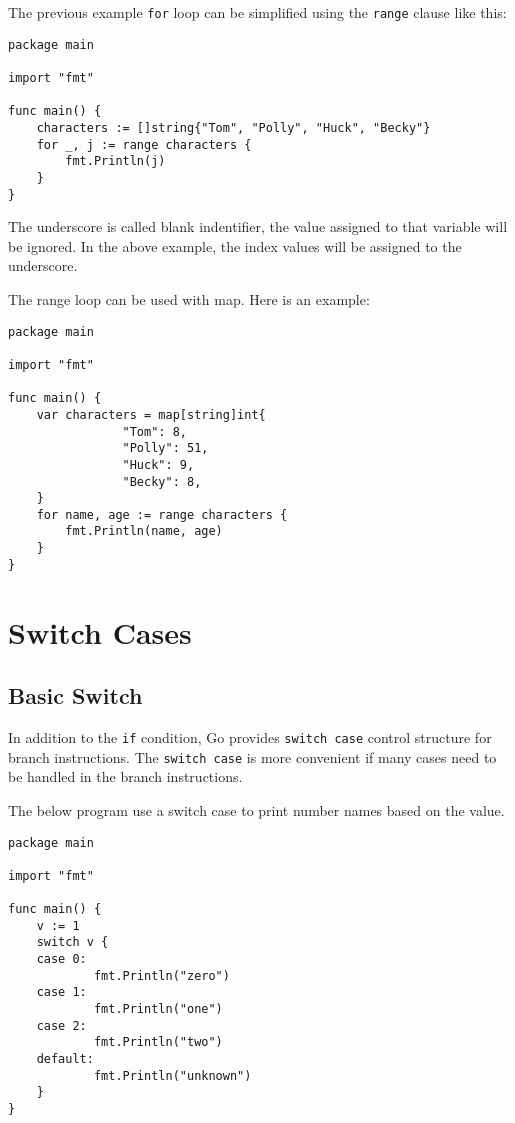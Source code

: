 The previous example \texttt{for} loop can be simplified using
the \texttt{range} clause like this:

\begin{lstlisting}[caption=Range loop with slice]
package main

import "fmt"

func main() {
    characters := []string{"Tom", "Polly", "Huck", "Becky"}
    for _, j := range characters {
        fmt.Println(j)
    }
}
\end{lstlisting}

The underscore is called blank indentifier, the value assigned to that
variable will be ignored.  In the above example, the index values will
be assigned to the underscore.

The range loop can be used with map.  Here is an example:

\begin{lstlisting}[caption=Range loop with map]
package main

import "fmt"

func main() {
    var characters = map[string]int{
                "Tom": 8,
                "Polly": 51,
                "Huck": 9,
                "Becky": 8,
    }
    for name, age := range characters {
        fmt.Println(name, age)
    }
}
\end{lstlisting}

\section{Switch Cases}

\subsection{Basic Switch}

In addition to the \texttt{if} condition, Go provides \texttt{switch
case} control structure for branch instructions.
The \texttt{switch case} is more convenient if many cases need to be
handled in the branch instructions.

The below program use a switch case to print number names based on the
value.

\begin{lstlisting}[caption=Switch case example]
package main

import "fmt"

func main() {
    v := 1
    switch v {
    case 0:
            fmt.Println("zero")
    case 1:
            fmt.Println("one")
    case 2:
            fmt.Println("two")
    default:
            fmt.Println("unknown")
    }
}
\end{lstlisting}

